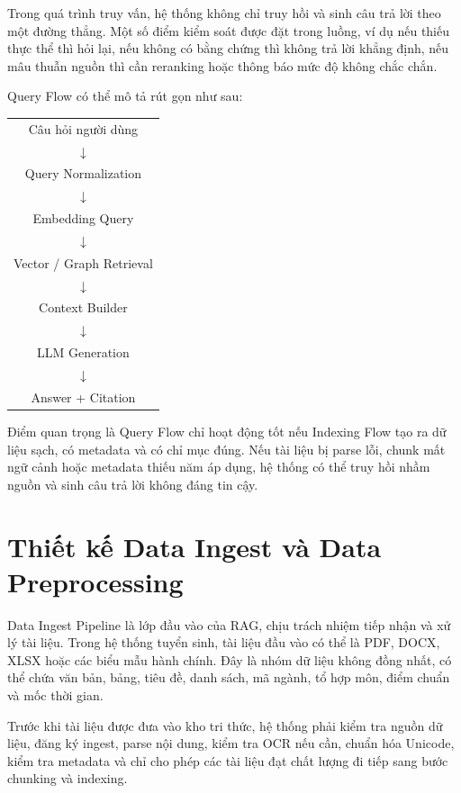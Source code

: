 \documentclass[12pt,a4paper]{report}
\begin{document}
Trong quá trình truy vấn, hệ thống không chỉ truy hồi và sinh câu trả lời theo một đường thẳng. Một số điểm kiểm soát được đặt trong luồng, ví dụ nếu thiếu thực thể thì hỏi lại, nếu không có bằng chứng thì không trả lời khẳng định, nếu mâu thuẫn nguồn thì cần reranking hoặc thông báo mức độ không chắc chắn.

Query Flow có thể mô tả rút gọn như sau:

\begin{center}
\begin{tabular}{c}
Câu hỏi người dùng \\
$\downarrow$ \\
Query Normalization \\
$\downarrow$ \\
Embedding Query \\
$\downarrow$ \\
Vector / Graph Retrieval \\
$\downarrow$ \\
Context Builder \\
$\downarrow$ \\
LLM Generation \\
$\downarrow$ \\
Answer + Citation
\end{tabular}
\end{center}

Điểm quan trọng là Query Flow chỉ hoạt động tốt nếu Indexing Flow tạo ra dữ liệu sạch, có metadata và có chỉ mục đúng. Nếu tài liệu bị parse lỗi, chunk mất ngữ cảnh hoặc metadata thiếu năm áp dụng, hệ thống có thể truy hồi nhầm nguồn và sinh câu trả lời không đáng tin cậy.

\section{Thiết kế Data Ingest và Data Preprocessing}

Data Ingest Pipeline là lớp đầu vào của RAG, chịu trách nhiệm tiếp nhận và xử lý tài liệu. Trong hệ thống tuyển sinh, tài liệu đầu vào có thể là PDF, DOCX, XLSX hoặc các biểu mẫu hành chính. Đây là nhóm dữ liệu không đồng nhất, có thể chứa văn bản, bảng, tiêu đề, danh sách, mã ngành, tổ hợp môn, điểm chuẩn và mốc thời gian.

Trước khi tài liệu được đưa vào kho tri thức, hệ thống phải kiểm tra nguồn dữ liệu, đăng ký ingest, parse nội dung, kiểm tra OCR nếu cần, chuẩn hóa Unicode, kiểm tra metadata và chỉ cho phép các tài liệu đạt chất lượng đi tiếp sang bước chunking và indexing.
\end{document}
